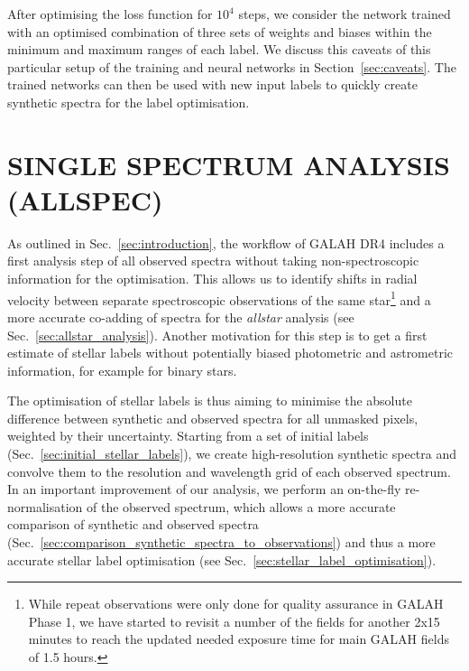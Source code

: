 \documentclass[
  journal=pasa,
  manuscript=research-paper, %
  year=2023,
  volume=37
]{cup-journal}
\begin{document}
After optimising the loss function for $10^4$ steps, we consider the network trained with an optimised combination of three sets of weights and biases within the minimum and maximum ranges of each label. We discuss this caveats of this particular setup of the training and neural networks in Section~\ref{sec:caveats}. The trained networks can then be used with new input labels to quickly create synthetic spectra for the label optimisation.

\section{SINGLE SPECTRUM ANALYSIS (ALLSPEC)}
\label{sec:allspec_analysis}

As outlined in Sec.~\ref{sec:introduction}, the workflow of GALAH DR4 includes a first analysis step of all observed spectra without taking non-spectroscopic information for the optimisation. This allows us to identify shifts in radial velocity between separate spectroscopic observations of the same star\footnote{While repeat observations were only done for quality assurance in GALAH Phase 1, we have started to revisit a number of the fields for another 2x15 minutes to reach the updated needed exposure time for main GALAH fields of 1.5 hours.} and a more accurate co-adding of spectra for the \textit{allstar} analysis (see Sec.~\ref{sec:allstar_analysis}). Another motivation for this step is to get a first estimate of stellar labels without potentially biased photometric and astrometric information, for example for binary stars.

The optimisation of stellar labels is thus aiming to minimise the absolute difference between synthetic and observed spectra for all unmasked pixels, weighted by their uncertainty. Starting from a set of initial labels (Sec.~\ref{sec:initial_stellar_labels}), we create high-resolution synthetic spectra and convolve them to the resolution and wavelength grid of each observed spectrum. In an important improvement of our analysis, we perform an on-the-fly re-normalisation of the observed spectrum, which allows a more accurate comparison of synthetic and observed spectra (Sec.~\ref{sec:comparison_synthetic_spectra_to_observations}) and thus a more accurate stellar label optimisation (see Sec.~\ref{sec:stellar_label_optimisation}).

\end{document}
